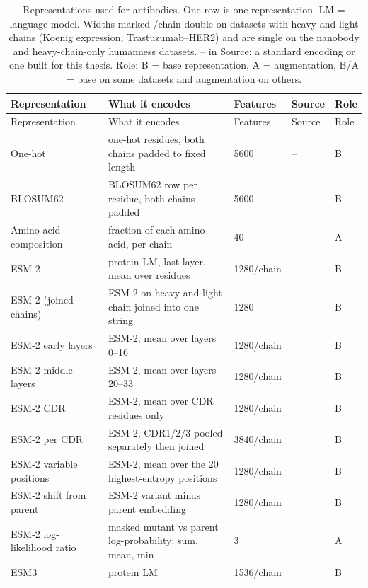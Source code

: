 \begin{longtable}{p{3.2cm}p{5.6cm}p{1.6cm}p{1.6cm}p{1.4cm}}
\caption{Representations used for antibodies. One row is one representation. LM = language model. Widths marked /chain double on datasets with heavy and light chains (Koenig expression, Trastuzumab--HER2) and are single on the nanobody and heavy-chain-only humanness datasets. -- in Source: a standard encoding or one built for this thesis. Role: B = base representation, A = augmentation, B/A = base on some datasets and augmentation on others.}\label{tab:reps_antibodies}\\
\toprule
Representation & What it encodes & Features & Source & Role \\
\midrule
\endfirsthead
\toprule
Representation & What it encodes & Features & Source & Role \\
\midrule
\endhead
\bottomrule
\endfoot
One-hot & one-hot residues, both chains padded to fixed length & 5600 & -- & B \\
BLOSUM62 & BLOSUM62 row per residue, both chains padded & 5600 & \citep{Henikoff1992} & B \\
Amino-acid composition & fraction of each amino acid, per chain & 40 & -- & A \\
ESM-2 & protein LM, last layer, mean over residues & 1280/chain & \citep{Lin2023} & B \\
ESM-2 (joined chains) & ESM-2 on heavy and light chain joined into one string & 1280 & \citep{Lin2023} & B \\
ESM-2 early layers & ESM-2, mean over layers 0--16 & 1280/chain & \citep{Lin2023} & B \\
ESM-2 middle layers & ESM-2, mean over layers 20--33 & 1280/chain & \citep{Lin2023} & B \\
ESM-2 CDR & ESM-2, mean over CDR residues only & 1280/chain & \citep{Lin2023} & B \\
ESM-2 per CDR & ESM-2, CDR1/2/3 pooled separately then joined & 3840/chain & \citep{Lin2023} & B \\
ESM-2 variable positions & ESM-2, mean over the 20 highest-entropy positions & 1280/chain & \citep{Lin2023} & B \\
ESM-2 shift from parent & ESM-2 variant minus parent embedding & 1280/chain & \citep{Lin2023} & B \\
ESM-2 log-likelihood ratio & masked mutant vs parent log-probability: sum, mean, min & 3 & \citep{Meier2021} & A \\
ESM3 & protein LM & 1536/chain & \citep{Hayes2025} & B \\

\end{longtable}
